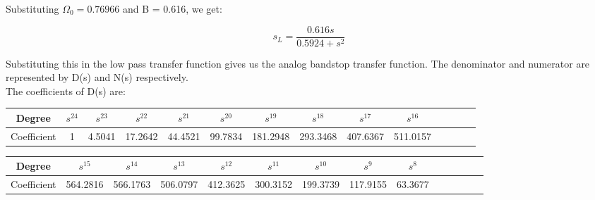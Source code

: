 \documentclass{article}
\begin{document}
Substituting $\Omega_0 = 0.76966$ and B = 0.616, we get:
\vspace{-5mm}
\begin{center}
    \begin{equation*}
        s_L = \frac{0.616s}{0.5924+s^2}
    \end{equation*}
\end{center}

Substituting this in the low pass transfer function gives us the analog bandstop transfer function. The denominator and numerator are represented by D(s) and N(s) respectively.\\

The coefficients of D(s) are:

\begin{table}[H]
		\begin{center}
		\begin{tabular}{|c|c|c|c|c|c|c|c|c|c|c|c|c|c|}
			\hline
			Degree & $s^{24}$ & $s^{23}$ & $s^{22}$  & $s^{21}$ & $s^{20}$ & $s^{19}$ & $s^{18}$ & $s^{17}$ & $s^{16}$\\
			
			\hline
                Coefficient & 1 & 4.5041 & 17.2642  & 44.4521 & 99.7834 & 181.2948 & 293.3468 & 407.6367 & 511.0157 \\
                \hline
            
		\end{tabular}
		\end{center}
\end{table}

\begin{table}[H]
		\begin{center}
		\begin{tabular}{|c|c|c|c|c|c|c|c|c|c|c|c|c|c|}
			\hline
			Degree &  $s^{15}$ & $s^{14}$  & $s^{13}$ & $s^{12}$ & $s^{11}$ & $s^{10}$ & $s^{9}$ & $s^8$ \\
			
			\hline
                Coefficient  & 564.2816 & 566.1763  & 506.0797 & 412.3625 & 300.3152 & 199.3739 & 117.9155 & 63.3677 \\
                \hline
            
		\end{tabular}
		\end{center}
\end{table}
\end{document}
